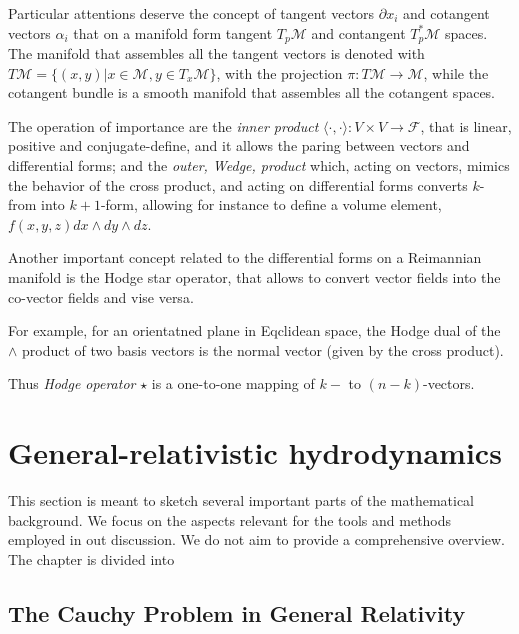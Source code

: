 Particular attentions deserve the concept of tangent vectors $\partial x_i$ and cotangent vectors $\alpha_i$ that on a manifold form tangent $T_p \mathcal{M}$ and contangent $T_p^*\mathcal{M}$ spaces. The manifold that assembles all the tangent vectors is denoted with $T\mathcal{M} = \{ (x,y) | x\in \mathcal{M}, y \in T_x \mathcal{M} \}$, with the projection $\pi:T\mathcal{M}\rightarrow \mathcal{M}$, while the cotangent bundle is a smooth manifold that assembles all the cotangent spaces.

The operation of importance are the \textit{inner product} $\langle \cdot,\cdot \rangle : V \times V \rightarrow \mathcal{F}$, that is linear, positive and conjugate-define, and it allows the paring between vectors and differential forms; 
and the \textit{outer, Wedge, product} which, acting on vectors, mimics the behavior of the cross product, and acting on differential forms converts $k$-from into $k+1$-form, allowing for instance to define a volume element, $f(x,y,z)dx \wedge dy \wedge dz$. 

Another important concept related to the differential forms on a Reimannian manifold is the Hodge star operator, that allows to convert vector fields into the co-vector fields and vise versa.

For example, for an orientatned plane in Eqclidean space,
the Hodge dual of the $\wedge$ product of two basis vectors is the normal vector (given by the cross product).

Thus \textit{Hodge operator} $\star$ is a one-to-one mapping of $k-$ to $(n-k)$-vectors.



\section{General-relativistic hydrodynamics}



This section is meant to sketch several important parts of the mathematical background. 
We focus on the aspects relevant for the tools and methods employed in out discussion. 
We do not aim to provide a comprehensive overview. 
The chapter is divided into 

    

\subsection{The Cauchy Problem in General Relativity}

